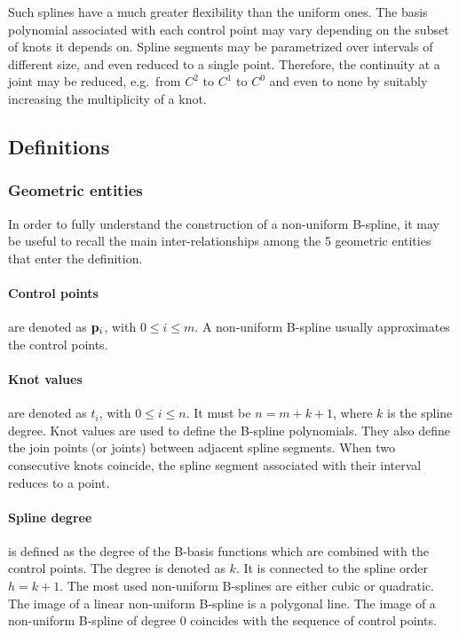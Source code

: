 \documentclass[11pt,oneside]{article}	%
\def\p#1{{\bf #1}}
\begin{document}
Such splines have a much greater flexibility than the uniform ones. 
The basis polynomial associated with each control point may vary
depending on the subset of knots it depends on.  Spline segments may
be parametrized over intervals of different size, and even reduced to
a single point.  Therefore, the continuity at a joint may be reduced, 
e.g.~from $C^{2}$ to $C^{1}$ to $C^{0}$ and even to none by suitably increasing the multiplicity
of a knot.

\subsection{Definitions}

\subsubsection{Geometric entities}

In order to fully understand the construction of a non-uniform B-spline, it may
be useful to recall the main inter-relationships among the 5 geometric
entities that enter the definition.

\paragraph{Control points} \hspace{-2mm}are denoted as $\p{p}_{i}$, 
with $0\leq i\leq m$.  A non-uniform B-spline usually approximates the control 
points. 

\paragraph{Knot values} \hspace{-2mm}are denoted as $t_{i}$, with $0\leq i\leq 
n$.  It must be $n = m+k+1$, where $k$ is the spline degree.
Knot values are used to define the B-spline polynomials. They also 
define the join points (or joints) between adjacent spline segments. 
When two consecutive knots coincide, the spline segment associated with 
their interval reduces to a point.

\paragraph{Spline degree} \hspace{-2mm}is defined as the degree of the
B-basis functions which are combined with the control points.  The
degree is denoted as $k$.  It is connected to the spline order $h =
k+1$.  The most used non-uniform B-splines are either cubic or quadratic.  The
image of a linear non-uniform B-spline is a polygonal line.  The image of a
non-uniform B-spline of degree $0$ coincides with the sequence of control
points.
\end{document}
